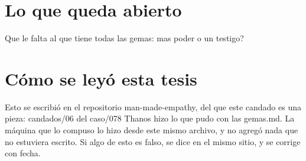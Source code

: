\documentclass[11pt,a4paper]{article}
\begin{document}
\section{Lo que queda abierto}
\textquestiondown{}Que le falta al que tiene todas las gemas: mas poder o un testigo?

\section*{Cómo se leyó esta tesis}
Esto se escribió en el repositorio man-made-empathy, del que este candado es una pieza: candados/06 del caso/078 Thanos hizo lo que pudo con las gemas.md. La máquina que lo compuso lo hizo desde este mismo archivo, y no agregó nada que no estuviera escrito. Si algo de esto es falso, se dice en el mismo sitio, y se corrige con fecha.
\end{document}
